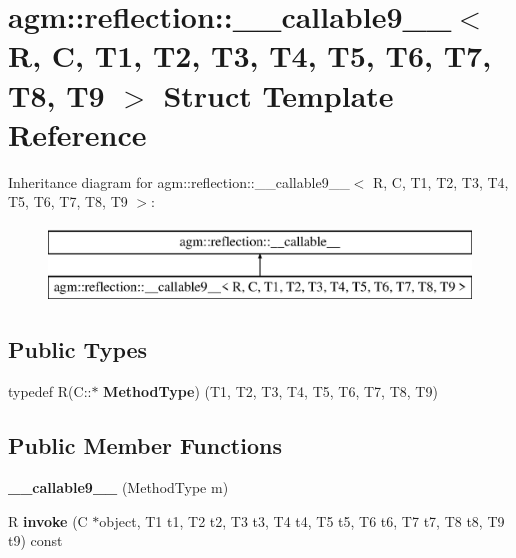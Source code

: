\hypertarget{structagm_1_1reflection_1_1____callable9____}{}\section{agm\+:\+:reflection\+:\+:\+\_\+\+\_\+callable9\+\_\+\+\_\+$<$ R, C, T1, T2, T3, T4, T5, T6, T7, T8, T9 $>$ Struct Template Reference}
\label{structagm_1_1reflection_1_1____callable9____}
Inheritance diagram for agm\+:\+:reflection\+:\+:\+\_\+\+\_\+callable9\+\_\+\+\_\+$<$ R, C, T1, T2, T3, T4, T5, T6, T7, T8, T9 $>$\+:\begin{figure}[H]
\begin{center}
\leavevmode
\includegraphics[height=2.000000cm]{structagm_1_1reflection_1_1____callable9____}
\end{center}
\end{figure}
\subsection*{Public Types}
\begin{DoxyCompactItemize}
\item 
typedef R(C\+::$\ast$ {\bfseries Method\+Type}) (T1, T2, T3, T4, T5, T6, T7, T8, T9)\hypertarget{structagm_1_1reflection_1_1____callable9_____aabda6e6b0a775b925aa877ab2dcfdf14}{}\label{structagm_1_1reflection_1_1____callable9_____aabda6e6b0a775b925aa877ab2dcfdf14}

\end{DoxyCompactItemize}
\subsection*{Public Member Functions}
\begin{DoxyCompactItemize}
\item 
{\bfseries \+\_\+\+\_\+callable9\+\_\+\+\_\+} (Method\+Type m)\hypertarget{structagm_1_1reflection_1_1____callable9_____a8fbbcbde788b3edbc78e2a1b6f63a737}{}\label{structagm_1_1reflection_1_1____callable9_____a8fbbcbde788b3edbc78e2a1b6f63a737}

\item 
R {\bfseries invoke} (C $\ast$object, T1 t1, T2 t2, T3 t3, T4 t4, T5 t5, T6 t6, T7 t7, T8 t8, T9 t9) const \hypertarget{structagm_1_1reflection_1_1____callable9_____a764c6f989dd6c03b846e457f22fa377b}{}\label{structagm_1_1reflection_1_1____callable9_____a764c6f989dd6c03b846e457f22fa377b}

\end{DoxyCompactItemize}

